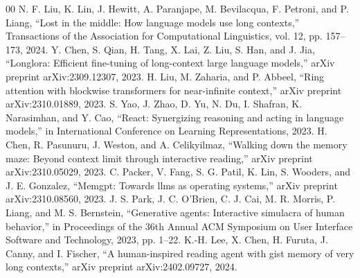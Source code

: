 \documentclass[conference]{IEEEtran}
\begin{document}
\begin{thebibliography}{00}
 N. F. Liu, K. Lin, J. Hewitt, A. Paranjape, M. Bevilacqua, F. Petroni, and P. Liang, ``Lost in the middle: How language models use long contexts,'' Transactions of the Association for Computational Linguistics, vol. 12, pp. 157–173, 2024.
 Y. Chen, S. Qian, H. Tang, X. Lai, Z. Liu, S. Han, and J. Jia, ``Longlora: Efficient fine-tuning of long-context large language models,'' arXiv preprint arXiv:2309.12307, 2023.
 H. Liu, M. Zaharia, and P. Abbeel, ``Ring attention with blockwise transformers for near-infinite context,'' arXiv preprint arXiv:2310.01889, 2023.
 S. Yao, J. Zhao, D. Yu, N. Du, I. Shafran, K. Narasimhan, and Y. Cao, ``React: Synergizing reasoning and acting in language models,'' in International Conference on Learning Representations, 2023.
 H. Chen, R. Pasunuru, J. Weston, and A. Celikyilmaz, ``Walking down the memory maze: Beyond context limit through interactive reading,'' arXiv preprint arXiv:2310.05029, 2023.
 C. Packer, V. Fang, S. G. Patil, K. Lin, S. Wooders, and J. E. Gonzalez, ``Memgpt: Towards llms as operating systems,'' arXiv preprint arXiv:2310.08560, 2023.
 J. S. Park, J. C. O’Brien, C. J. Cai, M. R. Morris, P. Liang, and M. S. Bernstein, ``Generative agents: Interactive simulacra of human behavior,'' in Proceedings of the 36th Annual ACM Symposium on User Interface Software and Technology, 2023, pp. 1–22.
 K.-H. Lee, X. Chen, H. Furuta, J. Canny, and I. Fischer, ``A human-inspired reading agent with gist memory of very long contexts,'' arXiv preprint arXiv:2402.09727, 2024.
\end{thebibliography}
\end{document}
